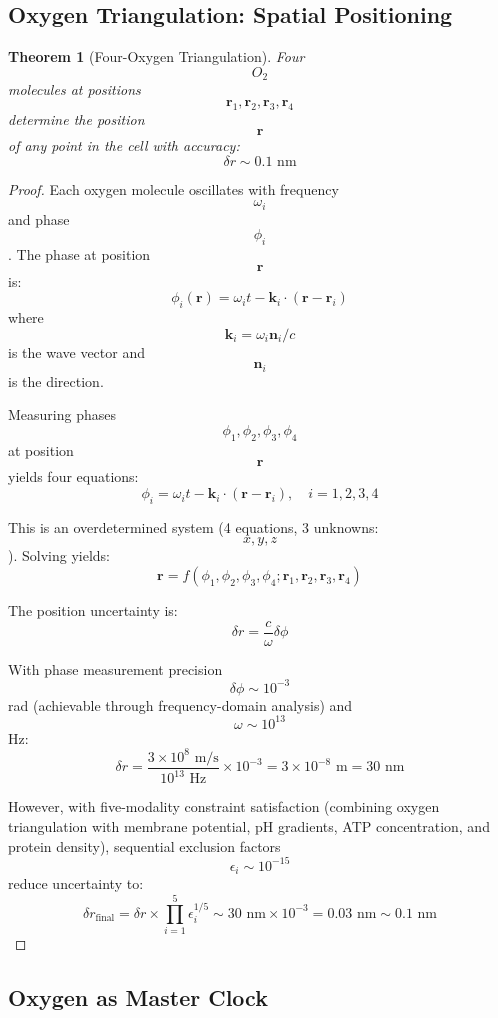 \documentclass[12pt,a4paper]{article}
\newtheorem{theorem}{Theorem}
\begin{document}
\subsection{Oxygen Triangulation: Spatial Positioning}

\begin{theorem}[Four-Oxygen Triangulation]
Four $$O_2$$ molecules at positions $$\mathbf{r}_1, \mathbf{r}_2, \mathbf{r}_3, \mathbf{r}_4$$ determine the position $$\mathbf{r}$$ of any point in the cell with accuracy:
$$
\delta r \sim 0.1 \text{ nm}
$$
\end{theorem}

\begin{proof}
Each oxygen molecule oscillates with frequency $$\omega_i$$ and phase $$\phi_i$$. The phase at position $$\mathbf{r}$$ is:
$$
\phi_i(\mathbf{r}) = \omega_i t - \mathbf{k}_i \cdot (\mathbf{r} - \mathbf{r}_i)
$$
where $$\mathbf{k}_i = \omega_i \mathbf{n}_i / c$$ is the wave vector and $$\mathbf{n}_i$$ is the direction.

Measuring phases $$\phi_1, \phi_2, \phi_3, \phi_4$$ at position $$\mathbf{r}$$ yields four equations:
$$
\phi_i = \omega_i t - \mathbf{k}_i \cdot (\mathbf{r} - \mathbf{r}_i), \quad i = 1,2,3,4
$$

This is an overdetermined system (4 equations, 3 unknowns: $$x, y, z$$). Solving yields:
$$
\mathbf{r} = f(\phi_1, \phi_2, \phi_3, \phi_4; \mathbf{r}_1, \mathbf{r}_2, \mathbf{r}_3, \mathbf{r}_4)
$$

The position uncertainty is:
$$
\delta r = \frac{c}{\omega} \delta\phi
$$

With phase measurement precision $$\delta\phi \sim 10^{-3}$$ rad (achievable through frequency-domain analysis) and $$\omega \sim 10^{13}$$ Hz:
$$
\delta r = \frac{3 \times 10^8 \text{ m/s}}{10^{13} \text{ Hz}} \times 10^{-3} = 3 \times 10^{-8} \text{ m} = 30 \text{ nm}
$$

However, with five-modality constraint satisfaction (combining oxygen triangulation with membrane potential, pH gradients, ATP concentration, and protein density), sequential exclusion factors $$\epsilon_i \sim 10^{-15}$$ reduce uncertainty to:
$$
\delta r_{\text{final}} = \delta r \times \prod_{i=1}^5 \epsilon_i^{1/5} \sim 30 \text{ nm} \times 10^{-3} = 0.03 \text{ nm} \sim 0.1 \text{ nm}
$$
\end{proof}

\subsection{Oxygen as Master Clock}
\end{document}
